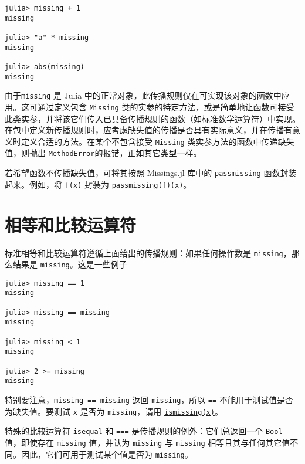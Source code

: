 \begin{verbatim}
julia> missing + 1
missing

julia> "a" * missing
missing

julia> abs(missing)
missing
\end{verbatim}



由于\texttt{missing} 是 Julia 中的正常对象，此传播规则仅在可实现该对象的函数中应用。这可通过定义包含 \texttt{Missing} 类的实参的特定方法，或是简单地让函数可接受此类实参，并将该它们传入已具备传播规则的函数（如标准数学运算符）中实现。在包中定义新传播规则时，应考虑缺失值的传播是否具有实际意义，并在传播有意义时定义合适的方法。在某个不包含接受 \texttt{Missing} 类实参方法的函数中传递缺失值，则抛出 \hyperlink{68769522931907606}{\texttt{MethodError}}的报错，正如其它类型一样。



若希望函数不传播缺失值，可将其按照 \href{https://github.com/JuliaData/Missings.jl}{Missings.jl} 库中的 \texttt{passmissing} 函数封装起来。例如，将 \texttt{f(x)} 封装为 \texttt{passmissing(f)(x)}。



\hypertarget{13926030736377467708}{}


\section{相等和比较运算符}



标准相等和比较运算符遵循上面给出的传播规则：如果任何操作数是 \texttt{missing}，那么结果是 \texttt{missing}。这是一些例子




\begin{verbatim}
julia> missing == 1
missing

julia> missing == missing
missing

julia> missing < 1
missing

julia> 2 >= missing
missing
\end{verbatim}



特别要注意，\texttt{missing == missing} 返回 \texttt{missing}，所以 \texttt{==} 不能用于测试值是否为缺失值。要测试 \texttt{x} 是否为 \texttt{missing}，请用 \hyperlink{3452327148507948899}{\texttt{ismissing(x)}}。



特殊的比较运算符 \hyperlink{269533589463185031}{\texttt{isequal}} 和 \hyperlink{7974744969331231272}{\texttt{===}} 是传播规则的例外：它们总返回一个 \texttt{Bool} 值，即使存在 \texttt{missing} 值，并认为 \texttt{missing} 与 \texttt{missing} 相等且其与任何其它值不同。因此，它们可用于测试某个值是否为 \texttt{missing}。




